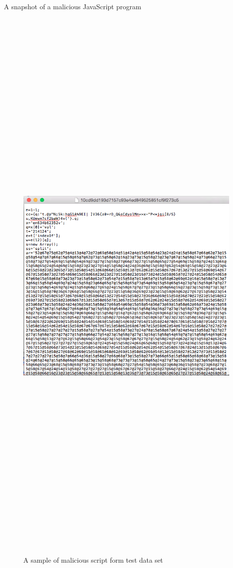 A snapshot of a malicious JavaScript program

\bigskip

\begin{figure}[htb]
\centering
\includegraphics[width=15cm,height=35cm,keepaspectratio]{image/malicious.png}
\caption[Malicious script sample]{A sample of malicious script form test data set} 
\label{fig:malicious}
\end{figure}

